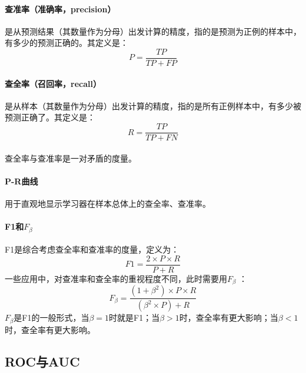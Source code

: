 \documentclass[10pt,letterpaper]{article}
\begin{document}
\paragraph{查准率（准确率，precision）} 是从预测结果（其数量作为分母）出发计算的精度，指的是预测为正例的样本中，有多少的预测正确的。其定义是：\\
\begin{equation}
	P = \frac{TP}{TP + FP}
\end{equation}

\paragraph{查全率（召回率，recall）} 是从样本（其数量作为分母）出发计算的精度，指的是所有正例样本中，有多少被预测正确了。其定义是：\\
\begin{equation}
	R = \frac{TP}{TP + FN}
\end{equation}

\paragraph{} 查全率与查准率是一对矛盾的度量。

\paragraph{P-R曲线} 用于直观地显示学习器在样本总体上的查全率、查准率。

\paragraph{F1和$F_\beta$} F1是综合考虑查全率和查准率的度量，定义为：\\
\begin{equation}
	F1 = \frac{ 2 \times P \times R }{P + R}
\end{equation}
一些应用中，对查准率和查全率的重视程度不同，此时需要用$F_\beta$ ： \\
\begin{equation}
	F_\beta = \frac{ (1+\beta^2) \times P \times R }{(\beta^2 \times P) + R}
\end{equation}
$F_\beta$是F1的一般形式，当$\beta = 1$时就是F1；当$\beta > 1$时，查全率有更大影响；当$\beta < 1$时，查全率有更大影响。

\subsection{ROC与AUC}
\end{document}

